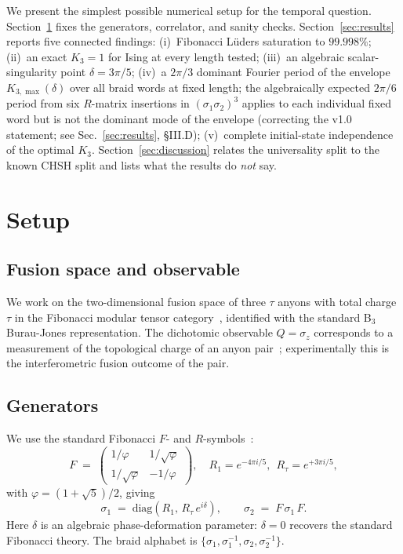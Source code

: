 \documentclass[aps,prx,reprint,amsmath,amssymb,floatfix,nofootinbib,superscriptaddress]{revtex4-2}
\begin{document}
We present the simplest possible numerical setup for the temporal
question. Section~\ref{sec:setup} fixes the generators, correlator,
and sanity checks. Section~\ref{sec:results} reports five connected
findings: (i)~Fibonacci L\"uders saturation to $99.998\%$;
(ii)~an exact $K_{3}=1$ for Ising at every length tested;
(iii)~an algebraic scalar-singularity point $\delta = 3\pi/5$;
(iv)~a $2\pi/3$ dominant Fourier period of the envelope
$K_{3,\max}(\delta)$ over all braid words at fixed length; the
algebraically expected $2\pi/6$ period from six $R$-matrix
insertions in $(\sigma_{1}\sigma_{2})^{3}$ applies to each
individual fixed word but is not the dominant mode of the envelope
(correcting the v1.0 statement; see Sec.~\ref{sec:results}, §III.D);
(v)~complete initial-state independence of the optimal $K_{3}$.
Section~\ref{sec:discussion} relates the universality split to the
known CHSH split and lists what the results do \emph{not} say.

\section{Setup}
\label{sec:setup}

\subsection{Fusion space and observable}

We work on the two-dimensional fusion space of three $\tau$ anyons
with total charge $\tau$ in the Fibonacci modular tensor
category~\cite{NayakSimonStern2008}, identified with the standard
B$_{3}$ Burau-Jones representation. The dichotomic observable
$Q = \sigma_{z}$ corresponds to a measurement of the topological
charge of an anyon pair~\cite{Bonderson2008}; experimentally this is
the interferometric fusion outcome of the pair.

\subsection{Generators}

We use the standard Fibonacci $F$- and $R$-symbols~\cite{NayakSimonStern2008}:
\begin{equation}
  F \;=\;
  \begin{pmatrix} 1/\varphi & 1/\sqrt{\varphi} \\
                  1/\sqrt{\varphi} & -1/\varphi \end{pmatrix},
  \quad
  R_{1} = e^{-4\pi i/5},\ \ R_{\tau} = e^{+3\pi i/5},
\end{equation}
with $\varphi = (1+\sqrt{5})/2$, giving
\begin{equation}
  \sigma_{1} \;=\; \mathrm{diag}(R_{1},\,R_{\tau}\,e^{i\delta}),
  \qquad
  \sigma_{2} \;=\; F\,\sigma_{1}\,F.
\end{equation}
Here $\delta$ is an algebraic phase-deformation parameter: $\delta=0$
recovers the standard Fibonacci theory. The braid alphabet is
$\{\sigma_{1},\sigma_{1}^{-1},\sigma_{2},\sigma_{2}^{-1}\}$.
\end{document}
